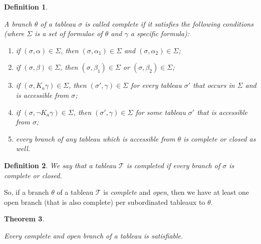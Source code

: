 \documentclass[submission,copyright,creativecommons]{eptcs}
\newtheorem{definition}{Definition}[section]
\newtheorem{theorem}[definition]{Theorem}
\begin{document}
        \begin{definition}
            \label{s5dyTableauxComplete}
        
            A branch $\theta$ of a tableau $\sigma$ is called \emph{complete} if it satisfies the following conditions (where $\Sigma$ is a set of formulae of $\theta$ and $\gamma$ a specific formula):
            
            \begin{enumerate}
                \item\label{s5dyTableauxCompleteAlpha} if $(\sigma, \alpha) \in \Sigma$, then $(\sigma, \alpha_1) \in \Sigma$ and $(\sigma, \alpha_2) \in \Sigma$;
                
                \item\label{s5dyTableauxCompleteBeta} if $(\sigma, \beta) \in \Sigma$, then $(\sigma, \beta_1) \in \Sigma$ or $(\sigma, \beta_2) \in \Sigma$;
                
                \item\label{s5dyTableauxCompleteK} if $(\sigma, K_a \gamma) \in \Sigma$, then $(\sigma', \gamma) \in \Sigma$ for every tableau $\sigma'$ that occurs in $\Sigma$ and is accessible from $\sigma$;
                
                \item\label{s5dyTableauxCompleteNK} if $(\sigma, \neg K_a \gamma) \in \Sigma$, then $(\sigma', \gamma) \in \Sigma$ for some tableau $\sigma'$ that is accessible from $\sigma$;
                
                \item\label{s5dyTableauxCompleteBranch} every branch of any tableau which is accessible from $\theta$ is complete or closed as well.
            \end{enumerate}
        \end{definition}
        
        \begin{definition}
            We say that a tableau $\mathscr{T}$ is \emph{completed} if every branch of $\sigma$ is complete or closed.
        \end{definition}
        
        So, if a branch $\theta$ of a tableau $\mathscr{T}$ is \emph{complete} and \emph{open}, then we have at least one open branch (that is also complete) per subordinated tableaux to $\theta$.
        
        \begin{theorem}
            \label{tableauxS5dyModel}
            
            Every complete and open branch of a tableau is satisfiable.
        \end{theorem}
        
\end{document}
